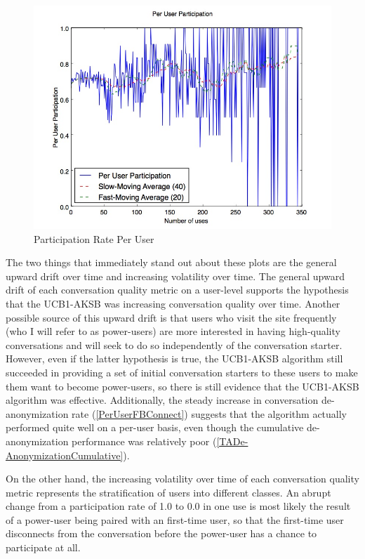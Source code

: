 \begin{figure}[H]
\centering
\includegraphics[trim= 0mm 0mm 0mm 0mm, clip, scale=0.5]{./Figures/PerUserParticipation.jpg}
\caption{Participation Rate Per User}
\label{fig:PerUserParticipation}
\end{figure}

The two things that immediately stand out about these plots are the general upward drift over time and increasing volatility over time. The general upward drift of each conversation quality metric on a user-level supports the hypothesis that the UCB1-AKSB was increasing conversation quality over time. Another possible source of this upward drift is that users who visit the site frequently (who I will refer to as power-users) are more interested in having high-quality conversations and will seek to do so independently of the conversation starter. However, even if the latter hypothesis is true, the UCB1-AKSB algorithm still succeeded in providing a set of initial conversation starters to these users to make them want to become power-users, so there is still evidence that the UCB1-AKSB algorithm was effective. Additionally, the steady increase in conversation de-anonymization rate (\autoref{PerUserFBConnect}) suggests that the algorithm actually performed quite well on a per-user basis, even though the cumulative de-anonymization performance was relatively poor (\autoref{TADe-AnonymizationCumulative}).

On the other hand, the increasing volatility over time of each conversation quality metric represents the stratification of users into different classes. An abrupt change from a participation rate of 1.0 to 0.0 in one use is most likely the result of a power-user being paired with an first-time user, so that the first-time user disconnects from the conversation before the power-user has a chance to participate at all.

